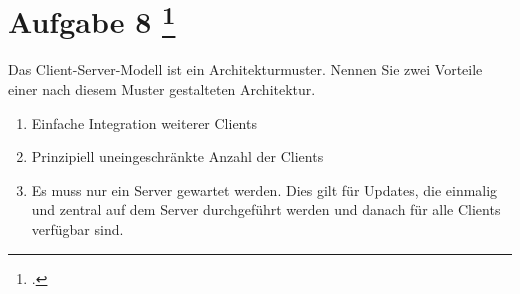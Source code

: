 \documentclass{lehramt-informatik-aufgabe}
\begin{document}
\section{Aufgabe 8
\footcite{66116:2021:03}}

Das Client-Server-Modell ist ein Architekturmuster. Nennen Sie zwei
Vorteile einer nach diesem Muster gestalteten Architektur.

\begin{liAntwort}
\begin{enumerate}
\item Einfache Integration weiterer Clients

\item Prinzipiell uneingeschränkte Anzahl der Clients

\item Es muss  nur ein Server gewartet werden. Dies gilt \zB für
Updates, die einmalig und zentral auf dem Server durchgeführt werden und
danach für alle Clients verfügbar sind.
\end{enumerate}
\end{liAntwort}
\end{document}
